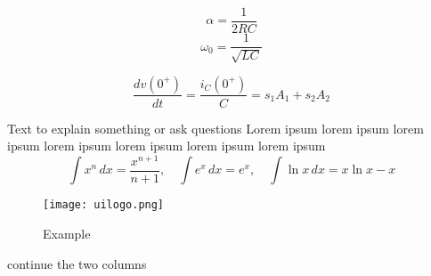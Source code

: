 \documentclass[a4paper, twoside, twocolumn,fleqn,10pt]{article} %
\begin{document}
\pagestyle{fancy} %



\[
    \tag{optional} \alpha = \frac{1}{2RC}
\]
\[
    \omega_{0} = \frac{1}{\sqrt{ LC }}
\]

\[
    \frac{dv(0^{+})}{dt} = \frac{i_{C}(0^{+})}{C} = s_{1}A_{1} + s_{2}A_{2}
\]

Text to explain something or ask questions Lorem ipsum lorem ipsum lorem ipsum lorem ipsum lorem ipsum lorem ipsum lorem ipsum
\[
    \int x^n \, dx = \frac{x^{n+1}}{n+1}, \quad \int e^x \, dx = e^x, \quad \int \ln x \, dx = x \ln x - x
\]
\newpage
\begin{figure}[ht]
    \centering
    \texttt{[image: uilogo.png]}
    \caption{Example}
\end{figure}

\twocolumn
continue the two columns
\end{document}
